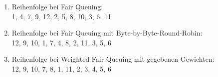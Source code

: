 \documentclass[12pt]{scrartcl}
\begin{document}
\setcounter{exnum}{3}
    \begin{enumerate}[label=(\alph*)]
        \item  Reihenfolge bei Fair Queuing: \\
            1, 4, 7, 9, 12, 2, 5, 8, 10, 3, 6, 11
        \item Reihenfolge bei Fair Queuing mit Byte-by-Byte-Round-Robin:\\
            12, 9, 10, 1, 7, 4, 8, 2, 11, 3, 5, 6 
        \item Reihenfolge bei Weighted Fair Queuing mit gegebenen Gewichten: \\
            12, 9, 10, 7, 8, 1, 11, 2, 3, 4, 5, 6
    \end{enumerate}

\end{document}
